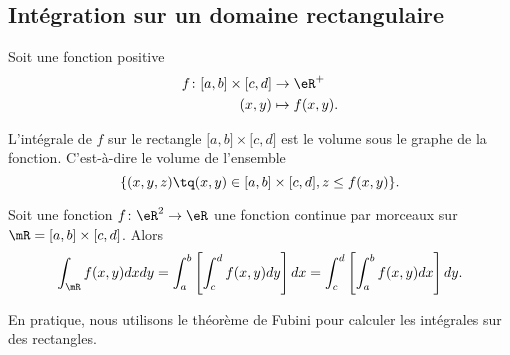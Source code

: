 \subsection{Intégration sur un domaine rectangulaire}
\label{PgRapIntMultFubiniRect}

Soit une fonction positive
\begin{equation}
	\begin{aligned}
		f\colon \mathopen[ a , b \mathclose]\times\mathopen[ c , d \mathclose] & \to \eR^+       \\
		(x,y)                                                                  & \mapsto f(x,y).
	\end{aligned}
\end{equation}

L'intégrale de \( f\) sur le rectangle \( \mathopen[ a , b \mathclose]\times\mathopen[ c , d \mathclose]\) est le volume sous le graphe de la fonction. C'est-à-dire le volume de l'ensemble
\begin{equation}
	\{ (x,y,z)\tq (x,y)\in\mathopen[ a , b \mathclose]\times\mathopen[ c , d \mathclose], z\leq f(x,y) \}.
\end{equation}

\begin{theorem}
	Soit une fonction \( f\colon \eR^2\to \eR\) une fonction continue par morceaux sur \( \mR=\mathopen[ a , b \mathclose]\times\mathopen[ c , d \mathclose]\). Alors
	\begin{equation}
		\int_{\mR}f(x,y)dxdy=\int_a^b\left[ \int_c^df(x,y)dy \right]dx=\int_c^d\left[ \int_a^bf(x,y)dx \right]dy.
	\end{equation}
\end{theorem}

En pratique, nous utilisons le théorème de Fubini pour calculer les intégrales sur des rectangles.

